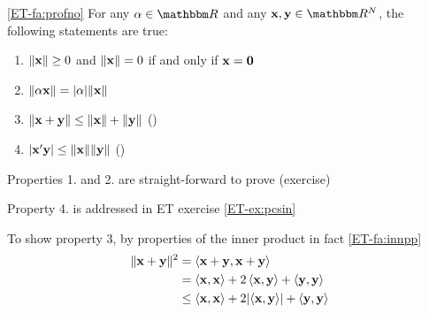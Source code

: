     


\begin{frame}
    
    \vspace{2em}
    \Fact\eqref{ET-fa:profno} For any $\alpha \in \RR$ and any $\boldx, \boldy \in \RR^N$,
    the following 
    statements are true:
    \begin{enumerate}
        \item $\| {\mathbf x} \| \geq 0$ and $\| {\mathbf x} \| = 0$ if and only if
            ${\mathbf x} = {\mathbf 0}$
            \vspace{1em}
        \item $\| \alpha {\mathbf x} \| = |\alpha| \| {\mathbf x} \|$
            \vspace{1em}
        \item $\| {\mathbf x} + {\mathbf y} \| \leq  \| {\mathbf x} \| + \| {\mathbf y} \|$
            ()
            \vspace{1em}
        \item $| {\mathbf x}' {\mathbf y} | \leq  \| {\mathbf x} \| \| {\mathbf y} \|$
            ()
    \end{enumerate}

\end{frame}

\begin{frame}

    \vspace{2em}
    Properties 1. and 2. are straight-forward to prove (exercise)
    
    Property 4. is addressed in ET exercise \ref{ET-ex:pcsin}
    
    \vspace{.7em}
    To show property 3, by properties of the inner product in fact \ref{ET-fa:innpp}
    \begin{align*}
        \label{eq:tifcs}
         \| {\mathbf x} + {\mathbf y} \|^2
        & = \left\langle{ {\mathbf x} +  {\mathbf y} ,  {\mathbf x} +  {\mathbf y} }\right\rangle
        \\& = \left\langle{ {\mathbf x} ,  {\mathbf x} }\right\rangle + 2 \left\langle{ {\mathbf x} ,  {\mathbf y} }\right\rangle +  \left\langle{ {\mathbf y} ,
         {\mathbf y} }\right\rangle
        \\& \leq \left\langle{ {\mathbf x} ,  {\mathbf x} }\right\rangle + 2 | \! \left\langle{ {\mathbf x} ,  {\mathbf y} }\right\rangle \! | +  \left\langle{ {\mathbf y} ,
         {\mathbf y} }\right\rangle
    \end{align*}
\end{frame}


